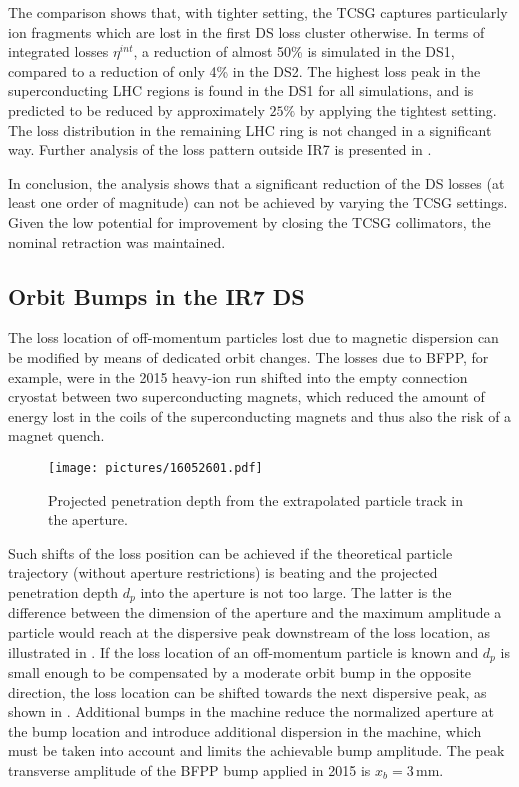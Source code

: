 The comparison shows that, with tighter setting, the TCSG captures particularly ion fragments which are lost in the first DS loss cluster otherwise. In terms of integrated losses $\eta^{int}$, a reduction of almost 50\% is simulated in the DS1, compared to a reduction of only 4\% in the DS2. The highest loss peak in the superconducting LHC regions is found in the DS1 for all simulations, and is predicted to be reduced by approximately $25\%$ by applying the tightest setting. The loss distribution in the remaining LHC ring is not changed in a significant way. Further analysis of the loss pattern outside IR7 is presented in .

In conclusion, the analysis shows that a significant reduction of the DS losses (at least one order of magnitude) can not be achieved by varying the TCSG settings. Given the low potential for improvement by closing the TCSG collimators, the nominal retraction was maintained. 



\subsection{Orbit Bumps in the IR7 DS}

The loss location of off-momentum particles lost due to magnetic dispersion can be modified by means of dedicated orbit changes. The losses due to BFPP, for example, were in the 2015 heavy-ion run shifted into the empty connection cryostat between two superconducting magnets, which reduced the amount of energy lost in the coils of the superconducting magnets and thus also the risk of a magnet quench. 

\begin{figure}[b]  
    \centering
    \texttt{[image: pictures/16052601.pdf]}
    \caption{Projected penetration depth from the extrapolated particle track in the aperture.}  
    \label{pic:16052601}
\end{figure}

Such shifts of the loss position can be achieved if the theoretical particle trajectory (without aperture restrictions) is beating and the projected penetration depth $d_p$ into the aperture is not too large. The latter is the difference between the dimension of the aperture and the maximum amplitude a particle would reach at the dispersive peak downstream of the loss location, as illustrated in . If the loss location of an off-momentum particle is known and $d_p$ is small enough to be compensated by a moderate orbit bump in the opposite direction, the loss location can be shifted towards the next dispersive peak, as shown in . Additional bumps in the machine reduce the normalized aperture at the bump location and introduce additional dispersion in the machine, which must be taken into account and limits the achievable bump amplitude. The peak transverse amplitude of the BFPP bump applied in 2015 is $x_b = 3\,$mm. 

